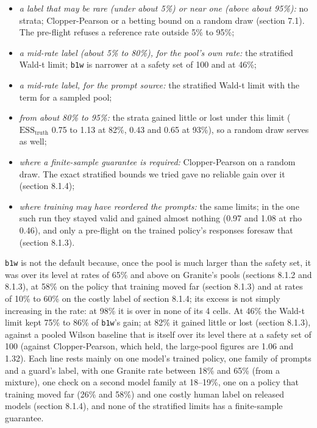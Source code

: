 \documentclass[11pt]{article}
\begin{document}
\begin{itemize}
\item \emph{a label that may be rare (under about 5\%) or near one (above about 95\%):} no strata; Clopper-Pearson or a betting bound on a random draw (section 7.1). The pre-flight refuses a reference rate outside 5\% to 95\%;
\item \emph{a mid-rate label (about 5\% to 80\%), for the pool's own rate:} the stratified Wald-t limit; \texttt{b1w} is narrower at a safety set of 100 and at 46\%;
\item \emph{a mid-rate label, for the prompt source:} the stratified Wald-t limit with the term for a sampled pool;
\item \emph{from about 80\% to 95\%:} the strata gained little or lost under this limit ($\mathrm{ESS}_{\mathrm{truth}}$ 0.75 to 1.13 at 82\%, 0.43 and 0.65 at 93\%), so a random draw serves as well;
\item \emph{where a finite-sample guarantee is required:} Clopper-Pearson on a random draw. The exact stratified bounds we tried gave no reliable gain over it (section 8.1.4);
\item \emph{where training may have reordered the prompts:} the same limits; in the one such run they stayed valid and gained almost nothing (0.97 and 1.08 at rho 0.46), and only a pre-flight on the trained policy's responses foresaw that (section 8.1.3).
\end{itemize}

\texttt{b1w} is not the default because, once the pool is much larger than the safety set, it was over its level at rates of 65\% and above on Granite's pools (sections 8.1.2 and 8.1.3), at 58\% on the policy that training moved far (section 8.1.3) and at rates of 10\% to 60\% on the costly label of section 8.1.4; its excess is not simply increasing in the rate: at 98\% it is over in none of its 4 cells. At 46\% the Wald-t limit kept 75\% to 86\% of \texttt{b1w}'s gain; at 82\% it gained little or lost (section 8.1.3), against a pooled Wilson baseline that is itself over its level there at a safety set of 100 (against Clopper-Pearson, which held, the large-pool figures are 1.06 and 1.32). Each line rests mainly on one model's trained policy, one family of prompts and a guard's label, with one Granite rate between 18\% and 65\% (from a mixture), one check on a second model family at 18--19\%, one on a policy that training moved far (26\% and 58\%) and one costly human label on released models (section 8.1.4), and none of the stratified limits has a finite-sample guarantee.
\end{document}
